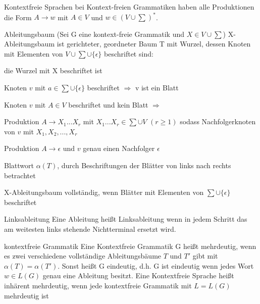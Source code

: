 \documentclass[avery5371, frame]{flashcards}
\begin{document}
\begin{flashcard}{Kontextfreie Sprachen}
    bei Kontext-freien Grammatiken haben alle Produktionen die Form $A\rightarrow w$ mit $A\in V$ und $w\in (V\cup \sum)^*$.
\end{flashcard}

\begin{flashcard}[Definition]{Ableitungsbaum (Sei G eine kontext-freie Grammatik und $X\in V\cup \sum$)}
    \scriptsize
    X-Ableitungsbaum ist gerichteter, geordneter Baum T mit Wurzel, dessen Knoten mit Elementen von $V\cup\sum\cup\{\epsilon\}$ beschriftet sind:
    \begin{itemize*}
        \item die Wurzel mit X beschriftet ist
        \item Knoten $v$ mit $a\in\sum\cup\{\epsilon\}$ beschriftet $\Rightarrow$ v ist ein Blatt
        \item Knoten $v$ mit $A\in V$ beschriftet und kein Blatt $\Rightarrow$
        \begin{itemize*}
            \item Produktion $A\rightarrow X_1...X_r$ mit $X_1...X_r\in\sum\cup V$ $(r\geq 1)$ sodass Nachfolgerknoten von $v$ mit $X_1,X_2,...,X_r$
            \item Produktion $A\rightarrow \epsilon$ und $v$ genau einen Nachfolger $\epsilon$
        \end{itemize*}
        \item Blattwort $\alpha(T)$, durch Beschriftungen der Blätter von links nach rechts betrachtet
        \item X-Ableitungsbaum vollständig, wenn Blätter mit Elementen von $\sum\cup\{\epsilon\}$ beschriftet
    \end{itemize*}
\end{flashcard}

\begin{flashcard}[Definition]{Linksableitung} Eine Ableitung heißt Linksableitung wenn in jedem Schritt das am weitesten links stehende Nichtterminal ersetzt wird.
\end{flashcard}

\begin{flashcard}[Definition]{kontextfreie Grammatik}
    Eine Kontextfreie Grammatik G heißt mehrdeutig, wenn es zwei verschiedene vollständige Ableitungsbäume $T$ und $T'$ gibt mit $\alpha(T)=\alpha(T')$.
    Sonst heißt G eindeutig, d.h. G ist eindeutig wenn jedes Wort $w\in L(G)$ genau eine Ableitung besitzt.
    Eine Kontextfreie Sprache heißt inhärent mehrdeutig, wenn jede kontextfreie Grammatik mit $L=L(G)$ mehrdeutig ist
\end{flashcard}
\end{document}
